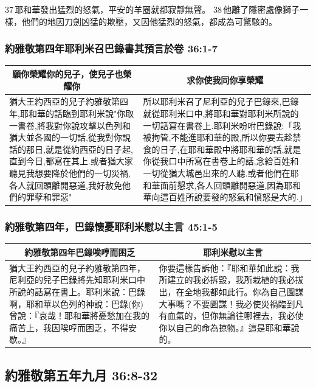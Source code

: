 37 耶和華發出猛烈的怒氣，平安的羊圈就都寂靜無聲。 38 他離了隱密處像獅子一樣，他們的地因刀劍凶猛的欺壓，又因他猛烈的怒氣，都成為可驚駭的。

\subsubsection{約雅敬第四年耶利米召巴錄書其預言於卷 36:1-7}
\begin{table}[H]
\centering
\begin{tabular}{p{7.5cm}|p{10.2cm}}\hline\hline
\multicolumn{1}{c|}{願你榮耀你的兒子，使兒子也榮耀你}&\multicolumn{1}{c}{求你使我同你享榮耀}\\\hline
猶大王約西亞的兒子約雅敬第四年,耶和華的話臨到耶利米說"你取一書卷,將我對你說攻擊以色列和猶大並各國的一切話,從我對你說話的那日,就是從約西亞的日子起,直到今日,都寫在其上.或者猶大家聽見我想要降於他們的一切災禍,各人就回頭離開惡道,我好赦免他們的罪孽和罪惡"
&所以耶利米召了尼利亞的兒子巴錄來,巴錄就從耶利米口中,將耶和華對耶利米所說的一切話寫在書卷上.耶利米吩咐巴錄說:「我被拘管,不能進耶和華的殿,所以你要去趁禁食的日子,在耶和華殿中將耶和華的話,就是你從我口中所寫在書卷上的話,念給百姓和一切從猶大城邑出來的人聽.或者他們在耶和華面前懇求,各人回頭離開惡道,因為耶和華向這百姓所說要發的怒氣和憤怒是大的.」 \\\hline
\end{tabular}
\end{table}

\subsubsection{約雅敬第四年，巴錄懷憂耶利米慰以主言 45:1-5}
\begin{table}[H]
\centering
\begin{tabular}{p{8.5cm}|p{8.50cm}}\hline\hline
\multicolumn{1}{c|}{約雅敬第四年巴錄唉哼而困乏}&\multicolumn{1}{c}{耶利米慰以主言}\\\hline
猶大王約西亞的兒子約雅敬第四年，尼利亞的兒子巴錄將先知耶利米口中所說的話寫在書上。耶利米說：巴錄啊，耶和華以色列的神說：巴錄(你)曾說：『哀哉！耶和華將憂愁加在我的痛苦上，我因唉哼而困乏，不得安歇。』
&你要這樣告訴他：『耶和華如此說：我所建立的我必拆毀，我所栽植的我必拔出，在全地我都如此行。你為自己圖謀大事嗎？不要圖謀！我必使災禍臨到凡有血氣的，但你無論往哪裡去，我必使你以自己的命為掠物。』這是耶和華說的。\\\hline
\end{tabular}
\end{table}

\subsection{約雅敬第五年九月 36:8-32}
